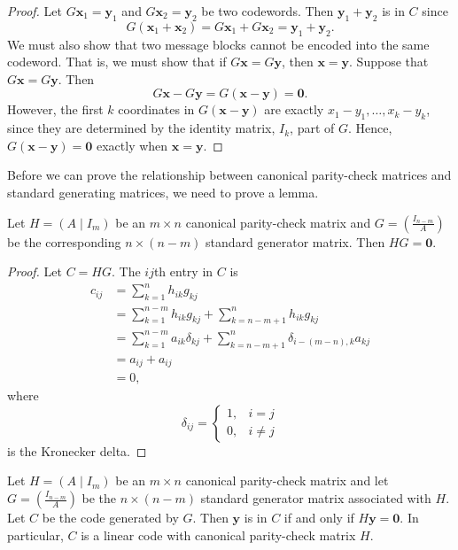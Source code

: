  
\begin{proof}
Let $G {\mathbf x}_1 = {\mathbf y}_1$ and $G {\mathbf
x}_2 ={\mathbf y}_2$ be two codewords. Then ${\mathbf y}_1
+ {\mathbf y}_2$ is in $C$ since 
\[
G( {\mathbf x}_1 + {\mathbf x}_2)
=
G {\mathbf x}_1 + G {\mathbf x}_2
=
{\mathbf y}_1 + {\mathbf y}_2.
\]
We must also show that two message blocks cannot be encoded into the
same codeword. That is, we must show that if $G {\mathbf x} = G
{\mathbf y}$, then ${\mathbf x} = {\mathbf y}$.  Suppose that $G
{\mathbf x} = G {\mathbf y}$. Then
\[
G {\mathbf x} - G {\mathbf y}
=
G( {\mathbf x} - {\mathbf y})
=
{\mathbf 0}.
\]
However, the first $k$ coordinates in $G( {\mathbf x} - {\mathbf
y})$ are exactly $x_1 -y_1, \ldots, x_k - y_k$, since they are
determined by the identity matrix, $I_k$, part of $G$. Hence, $G(
{\mathbf x} - {\mathbf y}) = {\mathbf 0}$ exactly when
${\mathbf x} = {\mathbf y}$.
\end{proof}
 
 \medskip
 
 
Before we can prove the relationship between canonical parity-check
matrices and standard generating matrices, we need to prove a lemma.
 
 
\begin{lemma}\label{ParityCheckLemma}
Let $H = (A \mid I_m )$ be an $m \times n$ canonical parity-check
matrix and $G = \left( \frac{I_{n-m} }{A} \right)$ be the
corresponding $n \times (n-m)$ standard generator matrix. Then $HG =
{\mathbf 0}$. 
\end{lemma}
 
 
\begin{proof}
Let $C = HG$.  The $ij$th entry in $C$ is
\begin{align*}
c_{ij}
& = 
\sum_{k=1}^n h_{ik} g_{kj} \\
& =  \sum_{k=1}^{n-m} h_{ik} g_{kj} + \sum_{k=n-m+1}^n h_{ik} g_{kj} \\
& = \sum_{k=1}^{n-m} a_{ik} \delta_{kj} + \sum_{k=n-m+1}^n \delta_{i-(m-n),k} a_{kj} \\
& =  a_{ij} + a_{ij} \\
& = 0,
\end{align*}
where
\[
\delta_{ij}\label{notekron}
=
\begin{cases}
1, & i = j \\
0, & i \neq j
\end{cases}
\]
is the Kronecker delta.
\end{proof}
 
 
\begin{theorem}
Let $H = (A \mid I_m )$ be an $m \times n$ canonical parity-check
matrix and let $G = \left( \frac{I_{n-m} }{A} \right) $ be the $n
\times (n-m)$ standard generator matrix associated with $H$. Let $C$
be the code generated by $G$. Then ${\mathbf y}$ is in $C$ if and only
if $H {\mathbf y} = {\mathbf 0}$. In particular, $C$ is a linear code with
canonical parity-check matrix $H$. 
\end{theorem}
 
